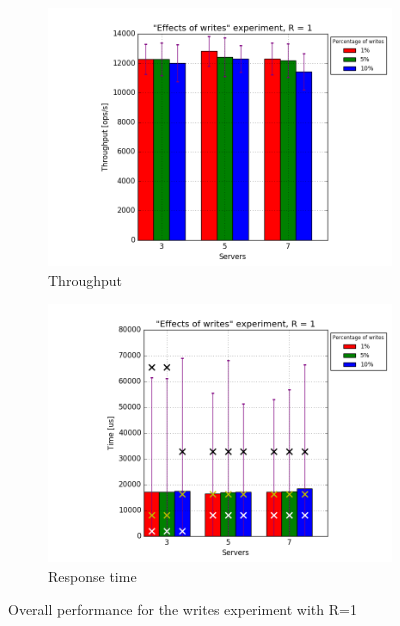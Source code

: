 \documentclass[11pt]{article}
\begin{document}
\begin{figure}
\centering
\begin{subfigure}{.5\textwidth}
	\centering
	\includegraphics[width=\linewidth]{plots/writes-1-replication}
	\caption{Throughput}
	\label{fig:writes-throughput-1}
\end{subfigure}%
\begin{subfigure}{.5\textwidth}
	\centering
	\includegraphics[width=\linewidth]{plots/writes-response_time-1-replication}
	\caption{Response time}
	\label{fig:writes-reponse-time-1}
\end{subfigure}
\caption{Overall performance for the writes experiment with R=1}
\label{fig:writes-overall-none}
\end{figure}
\end{document}
